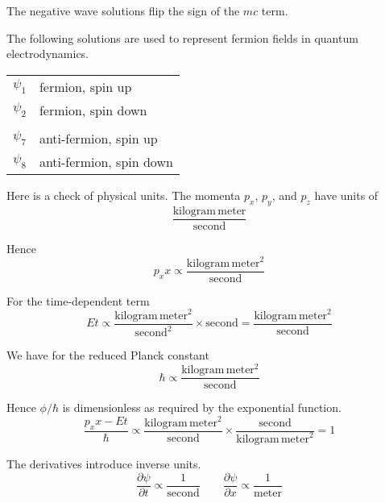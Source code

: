 \documentclass[12pt]{article}
\begin{document}
\noindent
The negative wave solutions flip the sign of the $mc$ term.

\bigskip
\noindent
The following solutions are used to represent fermion fields
in quantum electrodynamics.
\begin{center}
\begin{tabular}{ll}
$\psi_1$ & fermion, spin up\\
$\psi_2$ & fermion, spin down\\
\\
$\psi_7$ & anti-fermion, spin up\\
$\psi_8$ & anti-fermion, spin down
\end{tabular}
\end{center}

\noindent
Here is a check of physical units.
The momenta $p_x$, $p_y$, and $p_z$ have units of
\begin{equation*}
\frac{\text{kilogram}\,\text{meter}}{\text{second}}
\end{equation*}

\noindent
Hence
\begin{equation*}
p_xx\propto\frac{\text{kilogram}\,\text{meter}^2}{\text{second}}
\end{equation*}

\noindent
For the time-dependent term
\begin{equation*}
Et\propto\frac{\text{kilogram}\,\text{meter}^2}{\text{second}^2}\times\text{second}
=\frac{\text{kilogram}\,\text{meter}^2}{\text{second}}
\end{equation*}

\noindent
We have for the reduced Planck constant
\begin{equation*}
\hbar\propto\frac{\text{kilogram}\,\text{meter}^2}{\text{second}}
\end{equation*}

\noindent
Hence $\phi/\hbar$ is dimensionless as required by the exponential function.
\begin{equation*}
\frac{p_xx-Et}{\hbar}\propto\frac{\text{kilogram}\,\text{meter}^2}{\text{second}}
\times\frac{\text{second}}{\text{kilogram}\,\text{meter}^2}=1
\end{equation*}

\noindent
The derivatives introduce inverse units.
\begin{equation*}
\frac{\partial\psi}{\partial t}\propto\frac{1}{\text{second}}
\qquad
\frac{\partial\psi}{\partial x}\propto\frac{1}{\text{meter}}
\end{equation*}
\end{document}
